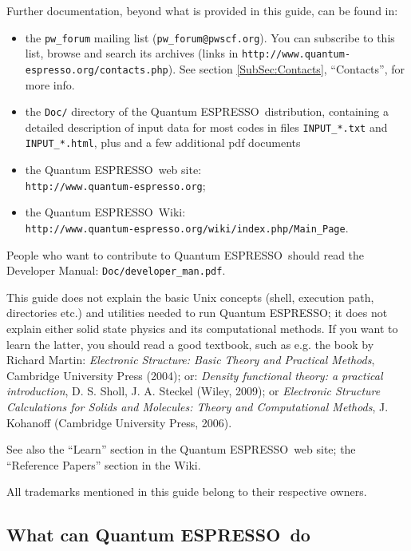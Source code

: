 \documentclass[12pt,a4paper]{article}
\def\qe{{\sc Quantum ESPRESSO}}
\begin{document}
Further documentation, beyond what is provided in this guide, can be found in:
\begin{itemize}
\item the \texttt{pw\_forum} mailing list (\texttt{pw\_forum@pwscf.org}).
   You can subscribe to this list, browse and search its archives
   (links in \texttt{http://www.quantum-espresso.org/contacts.php}).
   See section \ref{SubSec:Contacts}, ``Contacts'', for more info.
  \item the \texttt{Doc/} directory of the \qe\ distribution,
   containing a detailed description of input data for most codes
   in files \texttt{INPUT\_*.txt} and \texttt{INPUT\_*.html},
   plus and a few additional pdf documents
  \item the \qe\ web site:\\
   \texttt{http://www.quantum-espresso.org};
  \item the \qe\ Wiki:\\
   \texttt{http://www.quantum-espresso.org/wiki/index.php/Main\_Page}.
\end{itemize}
People who want to contribute to \qe\ should read the 
Developer Manual: \texttt{Doc/developer\_man.pdf}.

This guide does not explain the basic Unix concepts (shell, execution 
path, directories etc.) and utilities needed to run \qe; it does not 
explain either solid state physics and its computational methods.
If you want to learn the latter, you should read a good textbook, 
such as e.g. the book by Richard Martin:
{\em Electronic Structure: Basic Theory and Practical Methods},
Cambridge University Press (2004); or:
{\em Density functional theory: a practical introduction}, 
D. S. Sholl, J. A. Steckel (Wiley, 2009); or
{\em Electronic Structure Calculations for Solids and Molecules:
Theory and Computational Methods}, 
J. Kohanoff (Cambridge University Press, 2006). 

See also the ``Learn'' section in
the \qe\ web site; the ``Reference Papers'' 
section in the Wiki.

All trademarks mentioned in this guide belong to their respective owners.

\subsection{What can \qe\ do}
\end{document}
